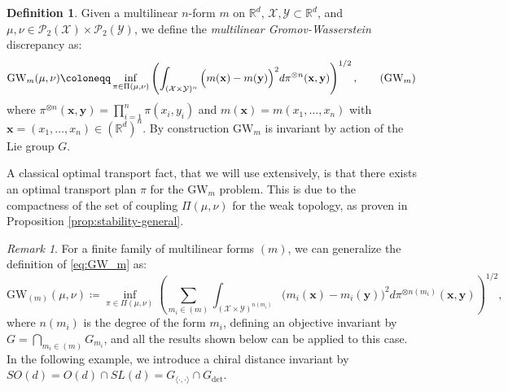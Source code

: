 \documentclass{article}
\newcommand{\R}{\mathbb{R}}
\newcommand{\Y}{\mathcal{Y}}
\newcommand{\X}{\mathcal{X}}
\newcommand{\1}{\mathbf{1}}
\newcommand{\GW}{\mathrm{GW}}
\renewcommand{\P}{\mathcal{P}}
\theoremstyle{definition}
\newtheorem{definition}{Definition}
\theoremstyle{remark}
\newtheorem*{remark}{Remark}
\begin{document}
\begin{definition}
    Given a multilinear $n$-form $m$ on $\R^d$, $\X,\Y\subset\R^d$, and $\mu,\nu\in\P_2(\X)\times\P_2(\Y)$, we define the \emph{multilinear Gromov-Wasserstein} discrepancy as:
\begin{equation}\label{eq:GW_m}
    \GW_{m}(\mu,\nu) \coloneqq  \inf_{\pi\in\Pi(\mu,\nu)}\left(\int_{(\X\times\Y)^{n}}\Big(m(\mathbf{x})-m(\mathbf{y})\Big)^2d\pi^{\otimes n}(\mathbf{x},\mathbf{y})\right)^{1/2},\tag{$\mathrm{GW}_m$}
\end{equation}
where $\pi^{\otimes n}(\mathbf{x},\mathbf{y})=\prod_{i=1}^n\pi(x_i,y_i)$ and $m(\mathbf{x})=m(x_1,\dots, x_n)$ with $\mathbf{x}=(x_1,\dots, x_n)\in (\R^d)^n$. By construction $\GW_{m}$ is invariant by action of the Lie group $G$.
\end{definition}
A classical optimal transport fact, that we will use extensively, is that there exists an optimal transport plan $\pi$ for the $\GW_m$ problem. This is due to the compactness of the set of coupling $\Pi(\mu,\nu)$ for the weak topology, as proven in Proposition \ref{prop:stability-general}.
\begin{remark}
    For a finite family of multilinear forms $(m)$, we can generalize the definition of \ref{eq:GW_m} as:
    \begin{equation*}
        \GW_{(m)}(\mu,\nu) \coloneqq  \inf_{\pi\in\Pi(\mu,\nu)}\left(\sum_{m_i\in(m)}\int_{(\X\times\Y)^{n(m_i)}}\Big(m_i(\mathbf{x})-m_i(\mathbf{y})\Big)^2d\pi^{\otimes n(m_i)}(\mathbf{x},\mathbf{y})\right)^{1/2},
    \end{equation*}
    where  $n(m_i)$ is the degree of the form $m_i$, defining an objective invariant by $G = \bigcap_{m_i\in(m)} G_{m_i}$, and 
     all the results shown below can be applied to this case. In the following example, we introduce a chiral distance invariant by $SO(d) = O(d)\cap SL(d)= G_{\langle\cdot,\cdot\rangle}\cap G_{\det}$.
\end{remark}
\end{document}
